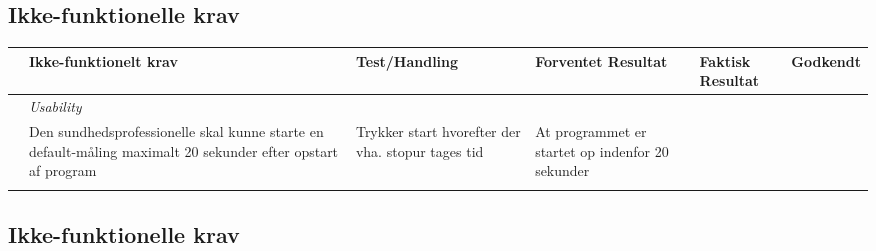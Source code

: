 \subsection{Ikke-funktionelle krav}

\begin{longtabu} to 
	& Ikke-funktionelt krav & Test/Handling & Forventet Resultat & Faktisk Resultat & Godkendt
	\\[-1ex] \midrule
	& \textit{Usability}  &  &  &  & \\ \midrule
	& Den sundhedsprofessionelle skal kunne starte en default-måling maximalt 20 sekunder efter opstart af program & Trykker start hvorefter der vha. stopur tages tid & At programmet er startet op indenfor 20 sekunder & & \\ \midrule
	
	& & & & &
	
\end{longtabu}


\subsection{Ikke-funktionelle krav}

